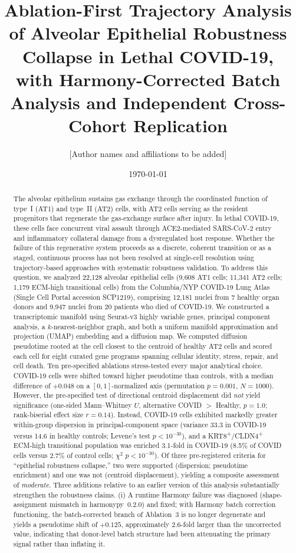 \documentclass[11pt]{article}
\title{Ablation-First Trajectory Analysis of Alveolar Epithelial Robustness Collapse in Lethal COVID-19,\\
with Harmony-Corrected Batch Analysis and Independent Cross-Cohort Replication}
\author{[Author names and affiliations to be added]}
\date{\today}
\begin{document}
\maketitle

\begin{abstract}
\noindent The alveolar epithelium sustains gas exchange through the coordinated function of type~I (AT1) and type~II (AT2) cells, with AT2 cells serving as the resident progenitors that regenerate the gas-exchange surface after injury. In lethal COVID-19, these cells face concurrent viral assault through ACE2-mediated SARS-CoV-2 entry and inflammatory collateral damage from a dysregulated host response. Whether the failure of this regenerative system proceeds as a discrete, coherent transition or as a staged, continuous process has not been resolved at single-cell resolution using trajectory-based approaches with systematic robustness validation. To address this question, we analyzed 22{,}128 alveolar epithelial cells (9{,}608 AT1 cells; 11{,}341 AT2 cells; 1{,}179 ECM-high transitional cells) from the Columbia/NYP COVID-19 Lung Atlas (Single Cell Portal accession SCP1219), comprising 12{,}181 nuclei from 7 healthy organ donors and 9{,}947 nuclei from 20 patients who died of COVID-19. We constructed a transcriptomic manifold using Seurat-v3 highly variable genes, principal component analysis, a $k$-nearest-neighbor graph, and both a uniform manifold approximation and projection (UMAP) embedding and a diffusion map. We computed diffusion pseudotime rooted at the cell closest to the centroid of healthy AT2 cells and scored each cell for eight curated gene programs spanning cellular identity, stress, repair, and cell death. Ten pre-specified ablations stress-tested every major analytical choice. COVID-19 cells were shifted toward higher pseudotime than controls, with a median difference of $+0.048$ on a $[0,1]$-normalized axis (permutation $p = 0.001$, $N = 1000$). However, the pre-specified test of directional centroid displacement did \emph{not} yield significance (one-sided Mann--Whitney $U$, alternative COVID $>$ Healthy, $p = 1.0$; rank-biserial effect size $r = 0.14$). Instead, COVID-19 cells exhibited markedly greater within-group dispersion in principal-component space (variance 33.3 in COVID-19 versus 14.6 in healthy controls; Levene's test $p < 10^{-30}$), and a KRT8\textsuperscript{+}/CLDN4\textsuperscript{+} ECM-high transitional population was enriched 3.1-fold in COVID-19 (8.5\% of COVID cells versus 2.7\% of control cells; $\chi^2$ $p < 10^{-30}$). Of three pre-registered criteria for ``epithelial robustness collapse,'' two were supported (dispersion; pseudotime enrichment) and one was not (centroid displacement), yielding a composite assessment of \emph{moderate}. Three additions relative to an earlier version of this analysis substantially strengthen the robustness claims. (i) A runtime Harmony failure was diagnosed (shape-assignment mismatch in harmonypy~0.2.0) and fixed; with Harmony batch correction functioning, the batch-corrected branch of Ablation~3 is no longer degenerate and yields a pseudotime shift of $+0.125$, approximately 2.6-fold larger than the uncorrected value, indicating that donor-level batch structure had been attenuating the primary signal rather than inflating it. 
\end{abstract}
\end{document}
